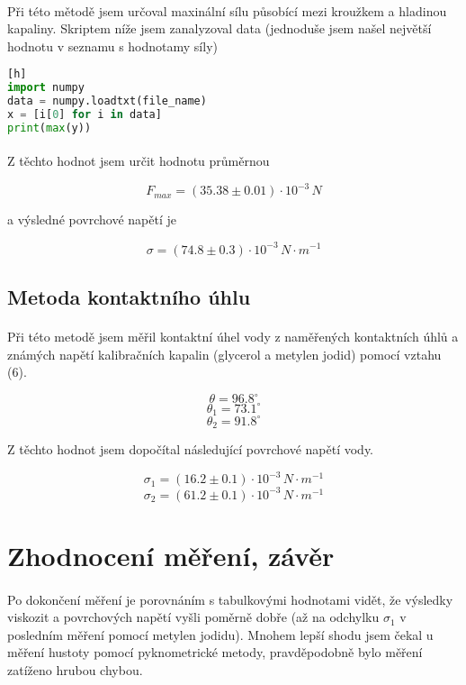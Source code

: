 \documentclass[a4paper,11pt]{article}
\begin{document}
        \paragraph{} Při této mětodě jsem určoval maxinální sílu působící mezi kroužkem a
        hladinou kapaliny. Skriptem níže jsem zanalyzoval data (jednoduše jsem našel největší
        hodnotu v seznamu s hodnotamy síly)

\begin{lstlisting}[language=Python][h]
import numpy
data = numpy.loadtxt(file_name)
x = [i[0] for i in data]
print(max(y))\end{lstlisting}

        \paragraph{} Z těchto hodnot jsem určit hodnotu průměrnou

        $$ F_{max} = \left(35.38 \pm 0.01 \right) \cdot 10^{-3} \, N $$

        a výsledné povrchové napětí je

        $$ \sigma = \left(74.8 \pm 0.3 \right) \cdot 10^{-3} \, N \cdot m^{-1} $$

    \subsection{Metoda kontaktního úhlu}

        \paragraph{} Při této metodě jsem měřil kontaktní úhel vody z naměřených kontaktních 
        úhlů a známých napětí kalibračních kapalin (glycerol a metylen jodid) pomocí vztahu 
        (6).
        
        $$\theta = 96.8 ^{\circ}$$
        $$\theta_{1} = 73.1 ^{\circ}$$
        $$\theta_{2} = 91.8 ^{\circ}$$

        Z těchto hodnot jsem dopočítal následující povrchové napětí vody.

        $$\sigma_{1} = \left(16.2 \pm 0.1 \right) \cdot 10^{-3} \, N \cdot m^{-1}$$
        $$\sigma_{2} = \left(61.2 \pm 0.1 \right) \cdot 10^{-3} \, N \cdot m^{-1}$$

\section{Zhodnocení měření, závěr}

    \paragraph{} Po dokončení měření je porovnáním s tabulkovými hodnotami vidět, že výsledky
    viskozit a povrchových napětí vyšli poměrně dobře (až na odchylku $\sigma_{1}$ v posledním měření
    pomocí metylen jodidu). Mnohem lepší shodu jsem čekal u měření hustoty pomocí pyknometrické metody,
    pravděpodobně bylo měření zatíženo hrubou chybou.
\end{document}
